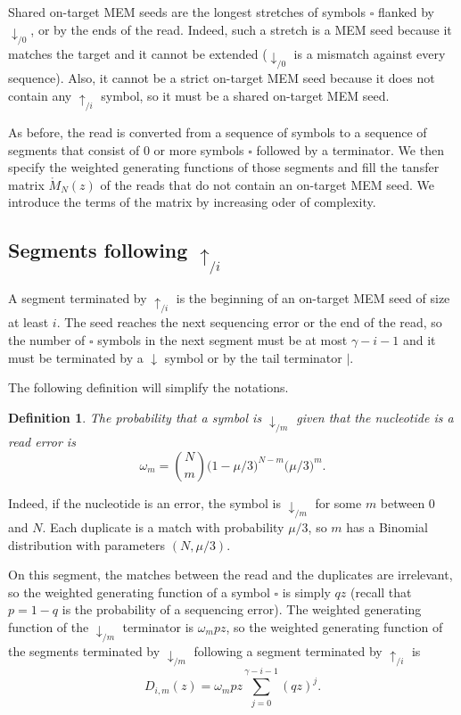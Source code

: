\documentclass{article}
\newtheorem{definition}{Definition}
\begin{document}
Shared on-target MEM seeds are the longest stretches of symbols $\square$
flanked by $\downarrow_{/0}$, or by the ends of the read. Indeed, such a
stretch is a MEM seed because it matches the target and it cannot be
extended ($\downarrow_{/0}$ is a mismatch against every sequence). Also,
it cannot be a strict on-target MEM seed because it does not contain any
$\uparrow_{/i}$ symbol, so it must be a shared on-target MEM seed.

As before, the read is converted from a sequence of symbols to a sequence
of segments that consist of 0 or more symbols $\square$ followed by a
terminator. We then specify the weighted generating functions of those
segments and fill the tansfer matrix $\mathring{M}_N(z)$ of the reads that
do not contain an on-target MEM seed. We introduce the terms of the matrix
by increasing oder of complexity.


\subsection{Segments following $\uparrow_{/i}$}

A segment terminated by $\uparrow_{/i}$ is the beginning of an on-target
MEM seed of size at least $i$. The seed reaches the next sequencing
error or the end of the read, so the number of $\square$ symbols in the
next segment must be at most $\gamma-i-1$ and it must be terminated by a
$\downarrow$ symbol or by the tail terminator $|$.

The following definition will simplify the notations.

\begin{definition}
The probability that a symbol is $\downarrow_{/m}$ given that the
nucleotide is a read error is
\begin{equation}
\label{eq:omega}
\omega_m = {N \choose m} \big(1 - \mu/3\big)^{N-m} \big(\mu/3\big)^m.
\end{equation}
\end{definition}

Indeed, if the nucleotide is an error, the symbol is $\downarrow_{/m}$ for
some $m$ between 0 and $N$. Each duplicate is a match with probability
$\mu/3$, so $m$ has a Binomial distribution with parameters $(N, \mu/3)$.

On this segment, the matches between the read and the duplicates are
irrelevant, so the weighted generating function of a symbol $\square$ is
simply $qz$ (recall that $p = 1-q$ is the probability of a sequencing
error). The weighted generating function of the $\downarrow_{/m}$
terminator is $\omega_m pz$, so the weighted generating function of the
segments terminated by $\downarrow_{/m}$ following a segment terminated by
$\uparrow_{/i}$ is
\begin{equation}
\label{eq:D}
D_{i,m}(z) = \omega_m pz \sum_{j=0}^{\gamma-i-1} (qz)^j.
\end{equation}
\end{document}
